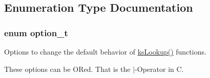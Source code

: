 \subsection{Enumeration Type Documentation}
\hypertarget{group__keyset_ga98a3d6a4016c9dad9cbd1a99a9c2a45a}{
\subsubsection[{option\+\_\+t}]{\setlength{\rightskip}{0pt plus 5cm}enum {\bf option\+\_\+t}}}\label{group__keyset_ga98a3d6a4016c9dad9cbd1a99a9c2a45a}


Options to change the default behavior of \hyperlink{group__keyset_gaa34fc43a081e6b01e4120daa6c112004}{ks\+Lookup()} functions. 

These options can be O\+Red. That is the $\vert$-\/\+Operator in C.

